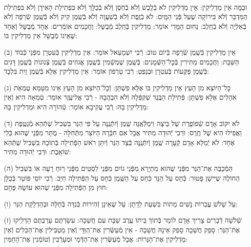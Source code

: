\documentclass[twoside, openany, parskip=half, 11pt]{book}
\begin{document}
\\
וּבַמָּה אֵין מַדְלִיקִין: אֵין מַדְלִיקִין לֹא בְֿלֶֽכֶשׁ וְֿלֹא בְֿחֹֽסֶן וְֿלֹא בְֿכַלָּךְ וְֿלֹא בִּפְתִילַת הָאִידָן וְֿלֹא בִּפְתִילַת הַמִּדְבָּר וְֿלֹא בִּירוֹקָה שֶׁעַל פְּֿנֵי הַמָּֽיִם: לֹא בְֿזֶֽפֶת וְֿלֹא בְֿשַׁעֲוָה וְֿלֹא בְּֿשֶֽׁמֶן קִיק וְֿלֹא בְּֿשֶֽׁמֶן שְֿׂרֵפָה וְֿלֹא בְֿאַלְיָה וְֿלֹא בְֿחֵֽלֶב: נַחוּם הַמָּדִי אוֹמֵר: מַדְלִיקִין בְּֿחֵֽלֶב מְֿבֻשָּׁל: וַחֲכָמִים אוֹמְֿרִים: אֶחָד מְֿבֻשָּׁל וְֿאֶחָד שֶׁאֵינוֹ מְֿבֻשָּׁל אֵין מַדְלִיקִין בּוֹ:

(ב) אֵין מַדְלִיקִין בְּֿשֶֽׁמֶן שְֿׂרֵפָה בְּֿיוֹם טוֹב: רְֿבִי יִשְׁמָעֵאל אוֹמֵר: אֵין מַדְלִיקִין בְּֿעִטְרָן מִפְּֿנֵי כְּֿבוֹד הַשַּׁבָּת: וַחֲכָמִים מַתִּירִין בְּֿכׇל־הַשְּֿׁמָנִים: בְּֿשֶֽׁמֶן שֻׁמְשְֿׁמִין בְּֿשֶֽׁמֶן אֱגוֹזִים בְּֿשֶֽׁמֶן צְֿנוֹנוֹת בְּֿשֶֽׁמֶן דָּגִים בְּֿשֶֽׁמֶן פַּקֻּעוֹת בְּֿעִטְרָן וּבְנֵפְטְ: רְֿבִי טַרְפוֹן אוֹמֵר: אֵין מַדְלִיקִין אֶלָּא בְּֿשֶֽׁמֶן זַֽיִת בִּלְבָד:

(ג) כׇּל־הַיּוֹצֵא מִן הָעֵץ אֵין מַדְלִיקִין בּוֹ אֶלָּא פִשְׁתָּן: וְֿכׇל־הַיּוֹצֵא מִן הָעֵץ אֵינוֹ מִטַּמֵּא טֻמְאַת אֹהָלִים אֶלָּא פִשְׁתָּן: פְּֿתִילַת הַבֶּֽגֶד שֶׁקִּפְּֿלָהּ וְֿלֹא הִבְהֲבָהּ - רְֿבִי אֱלִיעֶֽזֶר אוֹמֵר: טְֿמֵאָה הִיא וְֿאֵין מַדְלִיקִין בָּהּ: רְֿבִי עֲקִיבָא אוֹמֵר: טְֿהוֹרָה הִיא וּמַדְלִיקִין בָּהּ:

(ד) לֹא יִקּוֹב אָדָם שְֿׁפוֹפֶֽרֶת שֶׁל בֵּיצָה וִימַלְּֿאֶֽנָּה שֶֽׁמֶן וְֿיִתְּֿנֶֽנָּה עַל פִּי הַנֵּר בִּשְׁבִיל שֶׁתְּֿהֵא מְֿנַטֶּֽפֶת וַאֲפִילוּ הִיא שֶׁל חֶֽרֶס: וּרְבִי יְֿהוּדָה מַתִּיר אֲבָל אִם חִבְּֿרָהּ הַיּוֹצֵר מִתְּֿחִלָּה - מֻתָּר מִפְּֿנֵי שֶׁהוּא כְּֿלִי אֶחָד: לֹא יְֿמַלֵּא אָדָם קְֿעָרָה שֶֽׁמֶן וְֿיִתְּֿנֶֽנָּה בְּֿצַד הַנֵּר וְֿיִתֵּן רֹאשׁ הַפְּֿתִילָה בְּֿתוֹכָהּ בִּשְׁבִיל שֶׁתְּֿהֵא שׁוֹאָֽבֶת: וּרְבִי יְֿהוּדָה מַתִּיר:

(ה) הַמְֿכַבֶּה אֶת־הַנֵּר מִפְּֿנֵי שֶׁהוּא מִתְיָרֵא מִפְּֿנֵי גוֹיִם מִפְּֿנֵי לִסְטִים מִפְּֿנֵי רֽוּחַ רָעָה אוֹ בִּשְׁבִיל הַחוֹלֶה שֶׁיִּישָׁן פָּטוּר: כְּֿחָס עַל הַנֵּר כְּֿחָס עַל הַשֶּֽׁמֶן כְּֿחָס עַל הַפְּֿתִילָה חַיָּב: רְֿבִי יוֹסֵי פּוֹטֵר בְּֿכֻלָּן חוּץ מִן הַפְּֿתִילָה מִפְּֿנֵי שֶׁהוּא עוֹשָׂהּ פֶּחָם:

(ו) עַל שָׁלֹשׁ עֲבֵרוֹת נָשִׁים מֵתוֹת בִּשְׁעַת לֵדָתָן: עַל שֶׁאֵינָן זְֿהִירוֹת בְּֿנִדָּה בְּֿחַלָּה וּבְהַדְלָקַת הַנֵּר:

(ז) שְֿׁלֹשָׁה דְֿבָרִים צָרִיךְ אָדָם לוֹמַר בְּֿתוֹךְ בֵּיתוֹ עֶֽרֶב שַׁבָּת עִם חֲשֵׁכָה: עִשַׂרְתֶּם עֵרַבְתֶּם הַדְלִֽיקוּ אֶת־הַנֵּר: סָפֵק חֲשֵׁכָה סָפֵק אֵינָהּ חֲשֵׁכָה - אֵין מְֿעַשְּֿׂרִין אֶת־הַוַּדָּי וְֿאֵין מַטְבִּילִין אֶת־הַכֵּלִים וְֿאֵין מַדְלִיקִין אֶת־הַנֵּרוֹת: אֲבָל מְֿעַשְּֿׂרִין אֶת־הַדְּֿמָי וּמְעָרְֿבִין וְֿטוֹמְֿנִין אֶת־הַחַמִּין:
\end{document}
